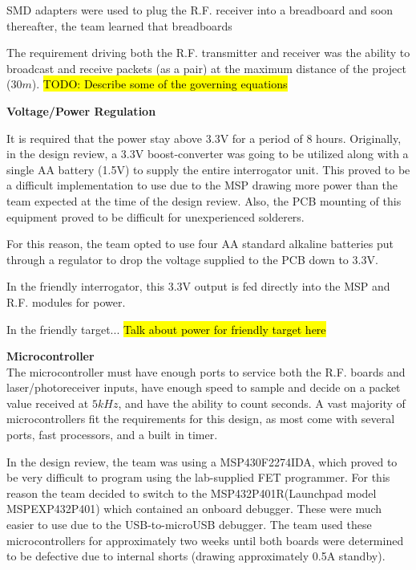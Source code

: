 \documentclass[letterpaper,10pt]{article}
\begin{document}
\begin{spacing}{1.15}
SMD adapters were used to plug the R.F. receiver into a breadboard and soon thereafter, the team learned that breadboards 

The requirement driving both the R.F. transmitter and receiver was the ability to broadcast and receive packets (as a pair) at the maximum distance of the project ($30m$). 
\hl{TODO: Describe some of the governing equations}

\hspace{5mm}\textbf{Voltage/Power Regulation} \label{section:interrogator-voltage-regulation-design-procedure}

It is required that the power stay above 3.3V for a period of 8 hours. Originally, in the design review, a 3.3V boost-converter was going to be utilized along with a single AA battery (1.5V) to supply the entire interrogator unit. This proved to be a difficult implementation to use due to the MSP drawing more power than the team expected at the time of the design review. Also, the PCB mounting of this equipment proved to be difficult for unexperienced solderers. 

For this reason, the team opted to use four AA standard alkaline batteries put through a regulator to drop the voltage supplied to the PCB down to 3.3V. 

In the friendly interrogator, this 3.3V output is fed directly into the MSP and R.F. modules for power.

In the friendly target... \hl{Talk about power for friendly target here}

 
\hspace{5mm}\textbf{Microcontroller} \label{section:system-design-procedure}\\
The microcontroller must have enough ports to service both the R.F. boards and laser/photoreceiver inputs, have enough speed to sample and decide on a packet value received at $5kHz$, and have the ability to count seconds. A vast majority of microcontrollers fit the requirements for this design, as most come with several ports, fast processors, and a built in timer.

In the design review, the team was using a MSP430F2274IDA, which proved to be very difficult to program using the lab-supplied FET programmer. For this reason the team decided to switch to the MSP432P401R(Launchpad model MSPEXP432P401) which contained an onboard debugger. These were much easier to use due to the USB-to-microUSB debugger. The team used these microcontrollers for approximately two weeks until both boards were determined to be defective due to internal shorts (drawing approximately 0.5A standby).


\end{spacing}
\end{document}
